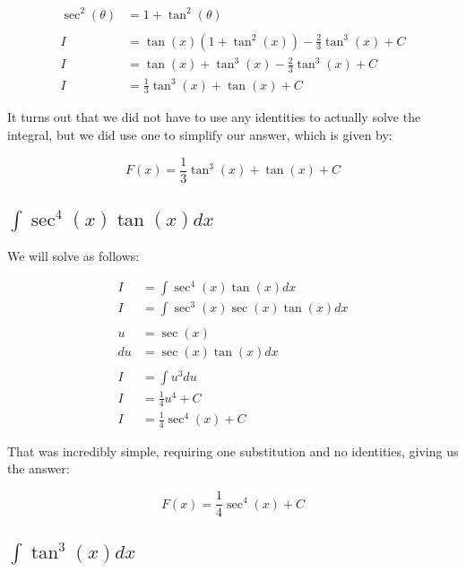 \documentclass[12pt]{article}
\begin{document}
\begin{align}
    \nonumber                                                            \\
    \sec^2(\theta) & = 1 + \tan^2(\theta)                                \\
    \nonumber                                                            \\
    I              & = \tan(x)(1 + \tan^2(x)) - \frac{2}{3}\tan^3(x) + C \\
    I              & = \tan(x) + \tan^3(x) - \frac{2}{3}\tan^3(x) + C    \\
    I              & = \frac{1}{3}\tan^3(x) + \tan(x) + C
\end{align}


It turns out that we did not have to use any identities to actually solve the integral, but we did use one to simplify our answer, which is given by:

$$
    F(x) = \frac{1}{3}\tan^3(x) + \tan(x) + C
$$

\subsection{$\int \sec^4(x)\tan(x) dx$}

We will solve as follows:


\begin{align}
    I  & = \int \sec^4(x)\tan(x) dx        \\
    I  & = \int \sec^3(x)\sec(x)\tan(x) dx \\
    \nonumber                              \\
    u  & = \sec(x)                         \\
    du & = \sec(x)\tan(x) dx               \\
    \nonumber                              \\
    I  & = \int u^3 du                     \\
    I  & = \frac{1}{4} u^4 + C             \\
    I  & = \frac{1}{4} \sec^4(x) + C
\end{align}


That was incredibly simple, requiring one substitution and no identities, giving us the answer:

$$
    F(x) = \frac{1}{4} \sec^4(x) + C
$$

\subsection{$\int \tan^3(x) dx$}
\end{document}
